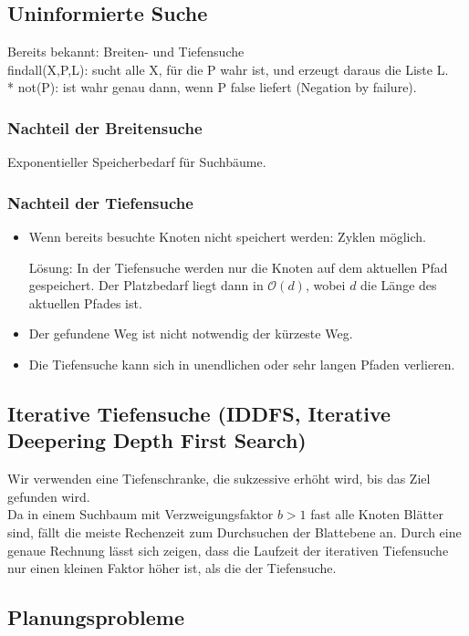 \documentclass[a4paper]{scrartcl}
\begin{document}
\subsection{Uninformierte Suche}
Bereits bekannt: Breiten- und Tiefensuche\\
findall(X,P,L): sucht alle X, für die P wahr ist, und erzeugt daraus die Liste L.\\*
not(P): ist wahr genau dann, wenn P false liefert (Negation by failure).

\subsubsection{Nachteil der Breitensuche} Exponentieller Speicherbedarf für Suchbäume.
\subsubsection{Nachteil der Tiefensuche} 
\begin{itemize}
\item Wenn bereits besuchte Knoten nicht speichert werden: Zyklen möglich.

Lösung: In der Tiefensuche werden nur die Knoten auf dem aktuellen Pfad gespeichert. Der Platzbedarf liegt dann in $\mathcal{O}(d)$, wobei $d$ die Länge des aktuellen Pfades ist.

\item Der gefundene Weg ist nicht notwendig der kürzeste Weg.

\item Die Tiefensuche kann sich in unendlichen oder sehr langen Pfaden verlieren.

\end{itemize}

\subsection{Iterative Tiefensuche (IDDFS, Iterative Deepering Depth First Search)} 
Wir verwenden eine Tiefenschranke, die sukzessive erhöht wird, bis das Ziel gefunden wird.\\
Da in einem Suchbaum mit Verzweigungsfaktor $b>1$ fast alle Knoten Blätter sind, fällt die meiste Rechenzeit zum Durchsuchen der Blattebene an. Durch eine genaue Rechnung lässt sich zeigen, dass die Laufzeit der iterativen Tiefensuche nur einen kleinen Faktor höher ist, als die der Tiefensuche.

\subsection{Planungsprobleme}
\end{document}
